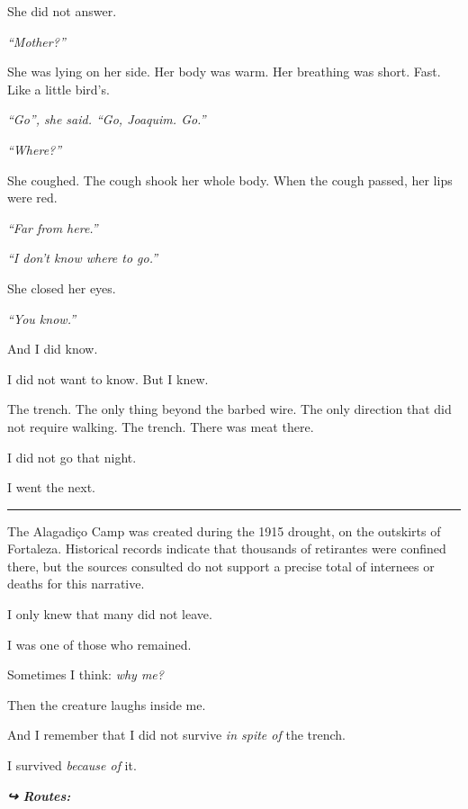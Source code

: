 \noindent She did not answer.

\noindent \textit{\textquotedblleft{}Mother?\textquotedblright{}}

\noindent She was lying on her side. Her body was warm. Her breathing was short. Fast. Like a little bird's.

\noindent \textit{\textquotedblleft{}Go\textquotedblright{}\textit{, she said. }\textquotedblleft{}Go, Joaquim. Go.\textquotedblright{}}

\noindent \textit{\textquotedblleft{}Where?\textquotedblright{}}

\noindent She coughed. The cough shook her whole body. When the cough passed, her lips were red.

\noindent \textit{\textquotedblleft{}Far from here.\textquotedblright{}}

\noindent \textit{\textquotedblleft{}I don't know where to go.\textquotedblright{}}

\noindent She closed her eyes.

\noindent \textit{\textquotedblleft{}You know.\textquotedblright{}}

\noindent And I did know.

\noindent I did not want to know. But I knew.

\noindent The trench. The only thing beyond the barbed wire. The only direction that did not require walking. The trench. There was meat there.

\noindent I did not go that night.

\noindent I went the next.

\vspace{0.5em}\noindent\rule{\textwidth}{0.5pt}\vspace{0.5em}

\noindent The Alagadiço Camp was created during the 1915 drought, on the outskirts of Fortaleza. Historical records indicate that thousands of retirantes were confined there, but the sources consulted do not support a precise total of internees or deaths for this narrative.

\noindent I only knew that many did not leave.

\noindent I was one of those who remained.

\noindent Sometimes I think: \textit{why me?}

\noindent Then the creature laughs inside me.

\noindent And I remember that I did not survive \textit{in spite of} the trench.

\noindent I survived \textit{because of} it.

\vspace{0.5em}
\noindent\textit{\textbf{↪ Routes:}  \rotasep {}}
